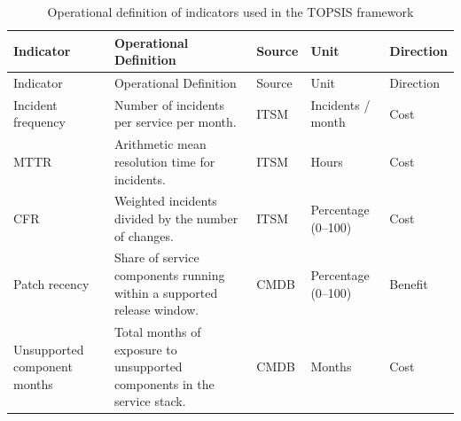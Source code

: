 \documentclass[
  12pt,
  letterpaper,
  12pt,
  oneside,
  english,
  onehalfspacing,
  headsepline]{MastersDoctoralThesis}
\begin{document}
\begin{longtable}[]{@{}
  >{\raggedright\arraybackslash}p{}
  >{\raggedright\arraybackslash}p{}
  >{\raggedright\arraybackslash}p{}
  >{\raggedright\arraybackslash}p{}
  >{\raggedright\arraybackslash}p{}@{}}
\caption{Operational definition of indicators used in the TOPSIS
framework}\label{tbl-indicators-def}\tabularnewline
\toprule\noalign{}
\begin{minipage}[b]{\linewidth}\raggedright
Indicator
\end{minipage} & \begin{minipage}[b]{\linewidth}\raggedright
Operational Definition
\end{minipage} & \begin{minipage}[b]{\linewidth}\raggedright
Source
\end{minipage} & \begin{minipage}[b]{\linewidth}\raggedright
Unit
\end{minipage} & \begin{minipage}[b]{\linewidth}\raggedright
Direction
\end{minipage} \\
\midrule\noalign{}
\endfirsthead
\toprule\noalign{}
\begin{minipage}[b]{\linewidth}\raggedright
Indicator
\end{minipage} & \begin{minipage}[b]{\linewidth}\raggedright
Operational Definition
\end{minipage} & \begin{minipage}[b]{\linewidth}\raggedright
Source
\end{minipage} & \begin{minipage}[b]{\linewidth}\raggedright
Unit
\end{minipage} & \begin{minipage}[b]{\linewidth}\raggedright
Direction
\end{minipage} \\
\midrule\noalign{}
\endhead
\bottomrule\noalign{}
\endlastfoot
Incident frequency & Number of incidents per service per month. & ITSM &
Incidents / month & Cost \\
MTTR & Arithmetic mean resolution time for incidents. & ITSM & Hours &
Cost \\
CFR & Weighted incidents divided by the number of changes. & ITSM &
Percentage (0--100) & Cost \\
Patch recency & Share of service components running within a supported
release window. & CMDB & Percentage (0--100) & Benefit \\
Unsupported component months & Total months of exposure to unsupported
components in the service stack. & CMDB & Months & Cost \\
\end{longtable}
\end{document}
